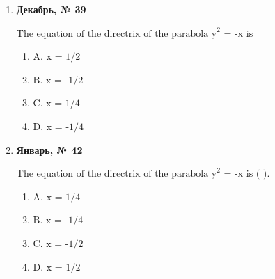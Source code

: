 \begin{enumerate}
\begin{enumerate}
\item $\displaystyle \text{A. 2}$
\item $\displaystyle \text{B. 3}$
\item $\displaystyle \text{C. 4}$
\item $\displaystyle \text{D. 5}$
\end{enumerate}
\item \textbf{Декабрь, № 39} \par \smallskip
$\displaystyle \text{The equation of the directrix of the parabola y}^{2}\text{ = -x is}$
\begin{enumerate}
\item $\displaystyle \text{A. x = 1/2}$
\item $\displaystyle \text{B. x = -1/2}$
\item $\displaystyle \text{C. x = 1/4}$
\item $\displaystyle \text{D. x = -1/4}$
\end{enumerate}
\item \textbf{Январь, № 42} \par \smallskip
$\displaystyle \text{The equation of the directrix of the parabola y}^{2}\text{ = -x is ( ).}$
\begin{enumerate}
\item $\displaystyle \text{A. x = 1/4}$
\item $\displaystyle \text{B. x = -1/4}$
\item $\displaystyle \text{C. x = -1/2}$
\item $\displaystyle \text{D. x = 1/2}$
\end{enumerate}
\end{enumerate}

